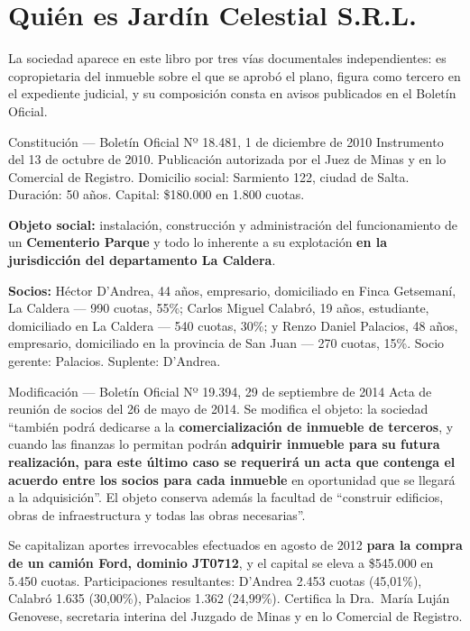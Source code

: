 \section{Quién es Jardín Celestial S.R.L.}

La sociedad aparece en este libro por tres vías documentales independientes: es copropietaria del inmueble sobre el que se aprobó el plano, figura como tercero en el expediente judicial, y su composición consta en avisos publicados en el Boletín Oficial.

\begin{ficha}{Constitución --- Boletín Oficial Nº 18.481, 1 de diciembre de 2010}
Instrumento del 13 de octubre de 2010. Publicación autorizada por el Juez de Minas y en lo Comercial de Registro. Domicilio social: Sarmiento 122, ciudad de Salta. Duración: 50 años. Capital: \$180.000 en 1.800 cuotas.

\textbf{Objeto social:} instalación, construcción y administración del funcionamiento de un \textbf{Cementerio Parque} y todo lo inherente a su explotación \textbf{en la jurisdicción del departamento La Caldera}.

\textbf{Socios:} Héctor D'Andrea, 44 años, empresario, domiciliado en Finca Getsemaní, La Caldera --- 990 cuotas, 55\%; Carlos Miguel Calabró, 19 años, estudiante, domiciliado en La Caldera --- 540 cuotas, 30\%; y Renzo Daniel Palacios, 48 años, empresario, domiciliado en la provincia de San Juan --- 270 cuotas, 15\%. Socio gerente: Palacios. Suplente: D'Andrea.
\end{ficha}

\begin{ficha}{Modificación --- Boletín Oficial Nº 19.394, 29 de septiembre de 2014}
Acta de reunión de socios del 26 de mayo de 2014. Se modifica el objeto: la sociedad ``también podrá dedicarse a la \textbf{comercialización de inmueble de terceros}, y cuando las finanzas lo permitan podrán \textbf{adquirir inmueble para su futura realización, para este último caso se requerirá un acta que contenga el acuerdo entre los socios para cada inmueble} en oportunidad que se llegará a la adquisición''. El objeto conserva además la facultad de ``construir edificios, obras de infraestructura y todas las obras necesarias''.

Se capitalizan aportes irrevocables efectuados en agosto de 2012 \textbf{para la compra de un camión Ford, dominio JT0712}, y el capital se eleva a \$545.000 en 5.450 cuotas. Participaciones resultantes: D'Andrea 2.453 cuotas (45,01\%), Calabró 1.635 (30,00\%), Palacios 1.362 (24,99\%). Certifica la Dra.\ María Luján Genovese, secretaria interina del Juzgado de Minas y en lo Comercial de Registro.
\end{ficha}

